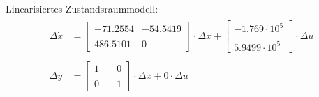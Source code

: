 \newline
Linearisiertes Zustandsraummodell:
\begin{align}
    \begin{split}
    \Delta\underline{\dot{x}} &= 
    \begin{bmatrix}
        -71.2554 & -54.5419 \\\\
        486.5101 & 0
    \end{bmatrix} \cdot \Delta \underline{x} +
    \begin{bmatrix}
        -1.769\cdot 10^5 \\\\
        5.9499\cdot 10^5
    \end{bmatrix} \cdot
    \Delta \underline{u} \\\\
    \Delta \underline{y} &= 
    \begin{bmatrix}
        1 & \quad 0 \\\\
        0 & \quad 1
    \end{bmatrix} \cdot \Delta \underline{x} + \underline{0} \cdot \Delta\underline{u}
    \end{split}
    \label{eq:Gleichung15}
\end{align}

